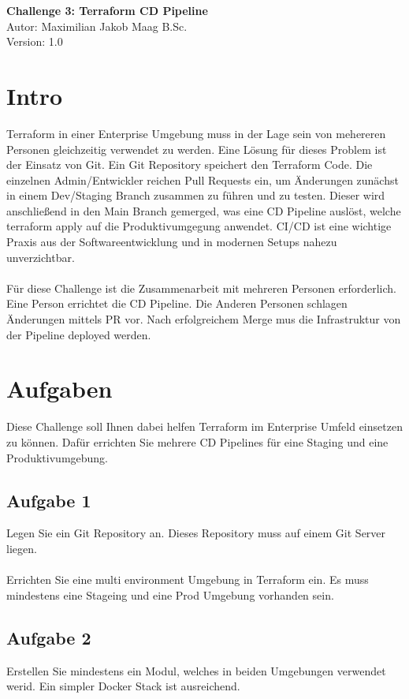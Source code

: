 \documentclass{article}
\begin{document}
    \begin{center}
        \Large \textbf{Challenge 3: Terraform CD Pipeline} \\ [6pt]
        \normalsize
        Autor: Maximilian Jakob Maag B.Sc. \\
        Version: 1.0
    \end{center}
    \section{Intro}
    Terraform in einer Enterprise Umgebung muss  in der Lage sein von mehereren Personen gleichzeitig verwendet zu werden.
    Eine Lösung für dieses Problem ist der Einsatz von Git. Ein Git Repository speichert den Terraform Code. Die einzelnen Admin/Entwickler reichen Pull Requests ein, um Änderungen zunächst in 
    einem Dev/Staging Branch zusammen zu führen und zu testen. Dieser wird anschließend in den Main Branch gemerged, was eine CD Pipeline auslöst, welche terraform apply auf die Produktivumgegung anwendet.
    CI/CD ist eine wichtige Praxis aus der Softwareentwicklung und in modernen Setups nahezu unverzichtbar.
    \\ \\
    Für diese Challenge ist die Zusammenarbeit mit mehreren Personen erforderlich. Eine Person errichtet die CD Pipeline.
    Die Anderen Personen schlagen Änderungen mittels PR vor. Nach erfolgreichem Merge mus die Infrastruktur von der Pipeline deployed werden.
    \section{Aufgaben}
    Diese Challenge soll Ihnen dabei helfen Terraform im Enterprise Umfeld einsetzen zu können.
    Dafür errichten Sie mehrere CD Pipelines für eine Staging und eine Produktivumgebung.

    \subsection{Aufgabe 1}
    Legen Sie ein Git Repository an. Dieses Repository muss auf einem Git Server liegen.  \\ \\
    Errichten Sie eine multi environment Umgebung in Terraform ein. Es muss mindestens eine Stageing und eine Prod Umgebung vorhanden sein.

    \subsection{Aufgabe 2}
    Erstellen Sie mindestens ein Modul, welches in beiden Umgebungen verwendet werid. Ein simpler Docker Stack ist ausreichend.
\end{document}
